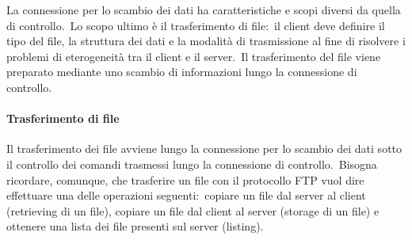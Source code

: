 La connessione per lo scambio dei dati ha caratteristiche e scopi diversi da quella di controllo.\
Lo scopo ultimo è il trasferimento di file:\ il client deve definire il tipo del file, la struttura dei dati e la modalità di trasmissione al fine di risolvere i problemi di eterogeneità tra il client e il server.\
Il trasferimento del file viene preparato mediante uno scambio di informazioni lungo la connessione di controllo.

\paragraph{Trasferimento di file}

Il trasferimento dei file avviene lungo la connessione per lo scambio dei dati sotto il controllo dei comandi trasmessi lungo la connessione di controllo.\
Bisogna ricordare, comunque, che trasferire un file con il protocollo FTP vuol dire effettuare una delle operazioni seguenti:\ copiare un file dal server al client (retrieving di un file), copiare un file dal client al server (storage di un file) e ottenere una lista dei file presenti sul server (listing).

